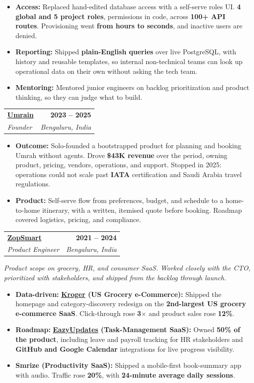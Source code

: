 \documentclass[letterpaper,10.5pt]{article}
\makeatletter
\newcommand{\entry}[4]{%
  \begin{tabularx}{\linewidth}{@{}X@{}r@{}}
    \textbf{#1} & \textbf{#4} \\
    \textit{#2} & \textit{#3} \\
  \end{tabularx}%
  \vspace{1pt}
}
\makeatother
\begin{document}
\begin{itemize}
  \item \textbf{Access:} Replaced hand-edited database access with a self-serve roles UI. \textbf{4 global and 5 project roles}, permissions in code, across \textbf{100+ API routes}. Provisioning went \textbf{from hours to seconds}, and inactive users are denied.
  \item \textbf{Reporting:} Shipped \textbf{plain-English queries} over live PostgreSQL, with history and reusable templates, so internal non-technical teams can look up operational data on their own without asking the tech team.
  \item \textbf{Mentoring:} Mentored junior engineers on backlog prioritization and product thinking, so they can judge what to build.
\end{itemize}

\entry{\href{https://umrain.in}{Umrain}}{Founder}{Bengaluru, India}{2023 -- 2025}
\begin{itemize}
  \item \textbf{Outcome:} Solo-founded a bootstrapped product for planning and booking Umrah without agents. Drove \textbf{\$43K revenue} over the period, owning product, pricing, vendors, operations, and support. Stopped in 2025: operations could not scale past \textbf{IATA} certification and Saudi Arabia travel regulations.
  \item \textbf{Product:} Self-serve flow from preferences, budget, and schedule to a home-to-home itinerary, with a written, itemised quote before booking. Roadmap covered logistics, pricing, and compliance.
\end{itemize}

\entry{\href{https://zopsmart.com}{ZopSmart}}{Product Engineer}{Bengaluru, India}{2021 -- 2024}
{\small\textit{Product scope on grocery, HR, and consumer SaaS. Worked closely with the CTO, prioritized with stakeholders, and shipped from the backlog through launch.}}
\begin{itemize}
  \item \textbf{Data-driven:} \textbf{\href{https://www.kroger.com}{Kroger} (US Grocery e-Commerce):} Shipped the homepage and category-discovery redesign on the \textbf{2nd-largest US grocery e-commerce SaaS}. Click-through rose \textbf{3$\times$} and product sales rose \textbf{12\%}.
  \item \textbf{Roadmap:} \textbf{\href{https://eazyupdates.com}{EazyUpdates} (Task-Management SaaS):} Owned \textbf{50\% of the product}, including leave and payroll tracking for HR stakeholders and \textbf{GitHub and Google Calendar} integrations for live progress visibility.
  \item \textbf{Smrize (Productivity SaaS):} Shipped a mobile-first book-summary app with audio. Traffic rose \textbf{20\%}, with \textbf{24-minute average daily sessions}.
\end{itemize}
\end{document}
